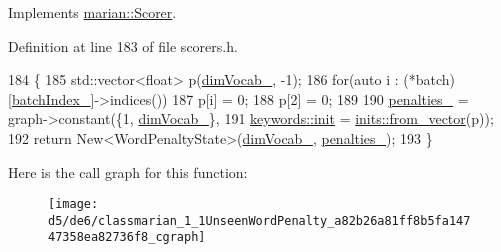 Implements \hyperlink{classmarian_1_1Scorer_aaefbe7744d015a273344eea6729b0bed}{marian\+::\+Scorer}.



Definition at line 183 of file scorers.\+h.


\begin{DoxyCode}
184                                                                   \{
185     std::vector<float> p(\hyperlink{classmarian_1_1UnseenWordPenalty_afe88c9dd2190a71ab2c214b60252b6b8}{dimVocab\_}, -1);
186     \textcolor{keywordflow}{for}(\textcolor{keyword}{auto} i : (*batch)[\hyperlink{classmarian_1_1UnseenWordPenalty_a03151d3a57f48ccdda4337d98a80cbf1}{batchIndex\_}]->indices())
187       p[i] = 0;
188     p[2] = 0;
189 
190     \hyperlink{classmarian_1_1UnseenWordPenalty_ac9cf380e25302b50550cee8a332ba17d}{penalties\_} = graph->constant(\{1, \hyperlink{classmarian_1_1UnseenWordPenalty_afe88c9dd2190a71ab2c214b60252b6b8}{dimVocab\_}\},
191                                  \hyperlink{namespacemarian_1_1keywords_afdd3807e3d6fe2bc979d11fa0cf3ee3e}{keywords::init} = 
      \hyperlink{namespacemarian_1_1inits_ab9566318ddbacd376c74cdbdfac091e4}{inits::from\_vector}(p));
192     \textcolor{keywordflow}{return} New<WordPenaltyState>(\hyperlink{classmarian_1_1UnseenWordPenalty_afe88c9dd2190a71ab2c214b60252b6b8}{dimVocab\_}, \hyperlink{classmarian_1_1UnseenWordPenalty_ac9cf380e25302b50550cee8a332ba17d}{penalties\_});
193   \}
\end{DoxyCode}


Here is the call graph for this function\+:
\nopagebreak
\begin{figure}[H]
\begin{center}
\leavevmode
\texttt{[image: d5/de6/classmarian\_1\_1UnseenWordPenalty\_a82b26a81ff8b5fa14747358ea82736f8\_cgraph]}
\end{center}
\end{figure}



